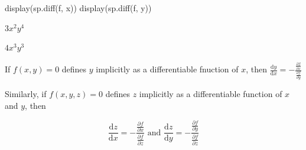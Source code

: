 \documentclass[
  letterpaper,
  DIV=11,
  numbers=noendperiod]{scrartcl}
\newenvironment{Shaded}{\begin{snugshade}}{\end{snugshade}}
\newcommand{\NormalTok}[1]{\textcolor[rgb]{0.00,0.23,0.31}{#1}}
\begin{document}
\begin{Shaded}
\begin{Highlighting}[numbers=left,,]
\NormalTok{display(sp.diff(f, x))}
\NormalTok{display(sp.diff(f, y))}
\end{Highlighting}
\end{Shaded}

$\displaystyle 3 x^{2} y^{4}$

$\displaystyle 4 x^{3} y^{3}$

If \(f(x,y) = 0\) defines \(y\) implicitly as a differentiable fnuction
of \(x\), then
\(\frac{\mathrm{d}y}{\mathrm{d}x} = -\frac{\frac{\partial f}{\partial x}}{\frac{\partial f}{\partial y}}\)

Similarly, if \(f(x, y, z) = 0\) defines \(z\) implicitly as a
differentiable function of \(x\) and \(y\), then

\[
\frac{\mathrm{d}z}{\mathrm{d}x} = -\frac{\frac{\partial f}{\partial x}}{\frac{\partial f}{\partial z}} \text{ and } \frac{\mathrm{d}z}{\mathrm{d}y} = -\frac{\frac{\partial f}{\partial y}}{\frac{\partial f}{\partial z}}
\]
\end{document}
